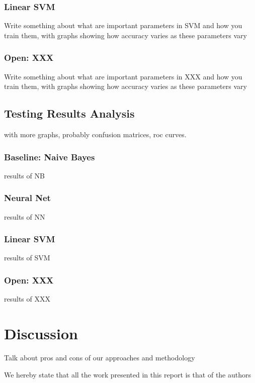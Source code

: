 \documentclass{acm_proc_article-sp}
\begin{document}
\subsubsection{Linear SVM }
Write something about what are important parameters in SVM and how you train them, with graphs showing how accuracy varies as these parameters vary

\subsubsection{Open: XXX}
Write something about what are important parameters in XXX and how you train them, with graphs showing how accuracy varies as these parameters vary



\subsection{Testing Results Analysis}
with more graphs, probably confusion matrices, roc curves.

\subsubsection{Baseline: Naive Bayes}
results of NB

\subsubsection{Neural Net}
results of NN

\subsubsection{Linear SVM }
results of SVM

\subsubsection{Open: XXX}
results of XXX 



\section{Discussion}
Talk about pros and cons	of	our	approaches and	methodology


We	hereby	state	that	all	the	work	 presented	in	this	report	is	that	of	the	authors

  
\end{document}
